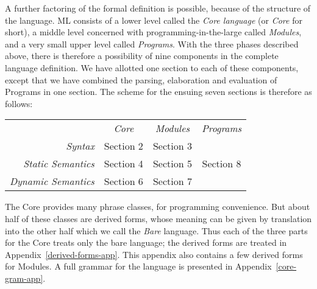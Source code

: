 A further factoring of the formal definition is possible,
because of the structure of the language.  ML consists of a lower level
called the {\sl Core language} (or {\sl Core} for short), a middle level
concerned  with programming-in-the-large called {\sl Modules},
and a very small upper level called {\sl Programs}.
With the three phases described above, there is therefore
a possibility of nine components in the
complete language definition. We have allotted one section to each
of these components, except that we have combined the parsing,
elaboration and evaluation of Programs in one section. The
scheme for the ensuing seven sections is therefore as follows:

\vspace*{3mm}
\begin{tabular}{rccc}
                & {\em Core} & {\em Modules} & {\em Programs} \\
\cline{2-4}
{\em Syntax}    &\multicolumn{1}{|c}{Section 2}
                             &\multicolumn{1}{|c}{Section 3}
                                             &\multicolumn{1}{|c|}{ }\\
\cline{2-3}
{\em Static Semantics}
                &\multicolumn{1}{|c}{Section 4}
                             &\multicolumn{1}{|c}{Section 5}
                                             &\multicolumn{1}{|c|}{Section 8}\\
\cline{2-3}
{\em Dynamic Semantics}
                &\multicolumn{1}{|c}{Section 6}
                             &\multicolumn{1}{|c}{Section 7}
                                             &\multicolumn{1}{|c|}{}\\
\cline{2-4}
\end{tabular}
\vspace*{3mm}


The Core provides many phrase classes, for programming convenience.
But about half of these classes are derived forms, whose meaning can be
given by translation into the other half which we call the
{\sl Bare} language.
Thus each of the three parts for the Core treats only the bare language;
the derived forms are treated in  Appendix~\ref{derived-forms-app}.
This appendix also contains a few derived forms for Modules.
A full grammar for the language is presented in
Appendix~\ref{core-gram-app}.

